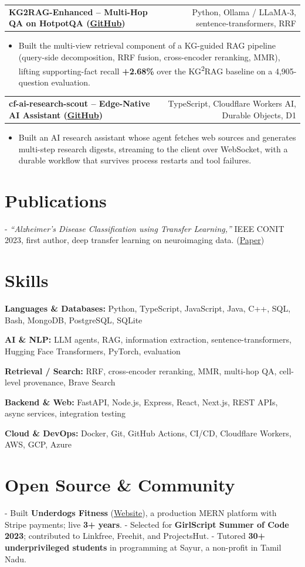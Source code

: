 \documentclass[letterpaper,11pt]{article}
\makeatletter
\newcommand{\projItem}[2]{%
  \vspace{2pt}
  \begin{tabular*}{\textwidth}{@{}l@{\extracolsep{\fill}}r@{}}
    \textbf{#1} & #2 \\
  \end{tabular*}\par\vspace{-3pt}
}
\newcommand{\skillLine}[2]{\textbf{#1:} #2\par\vspace{1.5pt}}
\newcommand{\inlineBlock}[1]{{\setlength{\leftskip}{0.18in}\small #1\par}}
\makeatother
\begin{document}
\projItem{KG2RAG-Enhanced -- Multi-Hop QA on HotpotQA {\normalfont\small(\href{https://github.com/Deva-1903/KG2RAG-685-NLP}{GitHub})}}{Python, Ollama / LLaMA-3, sentence-transformers, RRF}
\begin{itemize}
  \item Built the multi-view retrieval component of a KG-guided RAG pipeline (query-side decomposition, RRF fusion, cross-encoder reranking, MMR), lifting supporting-fact recall \textbf{+2.68\%} over the KG\textsuperscript{2}RAG baseline on a 4{,}905-question evaluation.
\end{itemize}

\projItem{cf-ai-research-scout -- Edge-Native AI Assistant {\normalfont\small(\href{https://github.com/Deva-1903/cf_ai_research_scout}{GitHub})}}{TypeScript, Cloudflare Workers AI, Durable Objects, D1}
\begin{itemize}
  \item Built an AI research assistant whose agent fetches web sources and generates multi-step research digests, streaming to the client over WebSocket, with a durable workflow that survives process restarts and tool failures.
\end{itemize}

\section{Publications}
\vspace{2pt}
\inlineBlock{- \textit{``Alzheimer's Disease Classification using Transfer Learning,''} IEEE CONIT 2023, first author, deep transfer learning on neuroimaging data. {\normalfont\small(\href{https://ieeexplore.ieee.org/document/10205760}{Paper})}}

\section{Skills}
\skillLine{Languages \& Databases}{Python, TypeScript, JavaScript, Java, C++, SQL, Bash, MongoDB, PostgreSQL, SQLite}
\skillLine{AI \& NLP}{LLM agents, RAG, information extraction, sentence-transformers, Hugging Face Transformers, PyTorch, evaluation}
\skillLine{Retrieval / Search}{RRF, cross-encoder reranking, MMR, multi-hop QA, cell-level provenance, Brave Search}
\skillLine{Backend \& Web}{FastAPI, Node.js, Express, React, Next.js, REST APIs, async services, integration testing}
\skillLine{Cloud \& DevOps}{Docker, Git, GitHub Actions, CI/CD, Cloudflare Workers, AWS, GCP, Azure}

\section{Open Source \& Community}
\inlineBlock{- Built \textbf{Underdogs Fitness} (\href{https://www.underdogsfitness.in/}{Website}), a production MERN platform with Stripe payments; live \textbf{3+ years}. - Selected for \textbf{GirlScript Summer of Code 2023}; contributed to Linkfree, Freehit, and ProjectsHut. - Tutored \textbf{30+ underprivileged students} in programming at Sayur, a non-profit in Tamil Nadu.}
\end{document}
